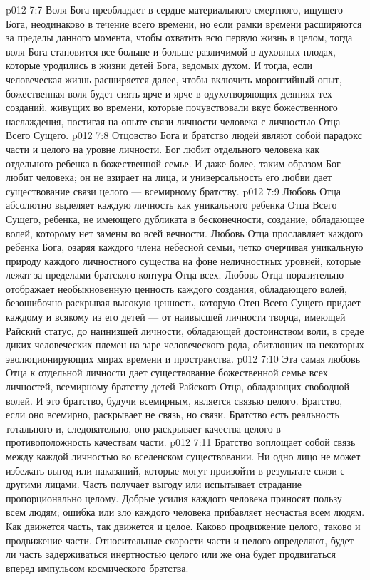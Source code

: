\vs p012 7:7 \pc Воля Бога преобладает в сердце материального смертного, ищущего Бога, неодинаково в течение всего времени, но если рамки времени расширяются за пределы данного момента, чтобы охватить всю первую жизнь в целом, тогда воля Бога становится все больше и больше различимой в духовных плодах, которые уродились в жизни детей Бога, ведомых духом. И тогда, если человеческая жизнь расширяется далее, чтобы включить моронтийный опыт, божественная воля будет сиять ярче и ярче в одухотворяющих деяниях тех созданий, живущих во времени, которые почувствовали вкус божественного наслаждения, постигая на опыте связи личности человека с личностью Отца Всего Сущего.
\vs p012 7:8 Отцовство Бога и братство людей являют собой парадокс части и целого на уровне личности. Бог любит  отдельного человека как отдельного ребенка в божественной семье. И даже более, таким образом Бог любит  человека; он не взирает на лица, и универсальность его любви дает существование связи целого --- всемирному братству.
\vs p012 7:9 Любовь Отца абсолютно выделяет каждую личность как уникального ребенка Отца Всего Сущего, ребенка, не имеющего дубликата в бесконечности, создание, обладающее волей, которому нет замены во всей вечности. Любовь Отца прославляет каждого ребенка Бога, озаряя каждого члена небесной семьи, четко очерчивая уникальную природу каждого личностного существа на фоне неличностных уровней, которые лежат за пределами братского контура Отца всех. Любовь Отца поразительно отображает необыкновенную ценность каждого создания, обладающего волей, безошибочно раскрывая высокую ценность, которую Отец Всего Сущего придает каждому и всякому из его детей --- от наивысшей личности творца, имеющей Райский статус, до наинизшей личности, обладающей достоинством воли, в среде диких человеческих племен на заре человеческого рода, обитающих на некоторых эволюционирующих мирах времени и пространства.
\vs p012 7:10 Эта самая любовь Отца к отдельной личности дает существование божественной семье всех личностей, всемирному братству детей Райского Отца, обладающих свободной волей. И это братство, будучи всемирным, является связью целого. Братство, если оно всемирно, раскрывает не  связь, но  связи. Братство есть реальность тотального и, следовательно, оно раскрывает качества целого в противоположность качествам части.
\vs p012 7:11 Братство воплощает собой связь между каждой личностью во вселенском существовании. Ни одно лицо не может избежать выгод или наказаний, которые могут произойти в результате связи с другими лицами. Часть получает выгоду или испытывает страдание пропорционально целому. Добрые усилия каждого человека приносят пользу всем людям; ошибка или зло каждого человека прибавляет несчастья всем людям. Как движется часть, так движется и целое. Каково продвижение целого, таково и продвижение части. Относительные скорости части и целого определяют, будет ли часть задерживаться инертностью целого или же она будет продвигаться вперед импульсом космического братства.
